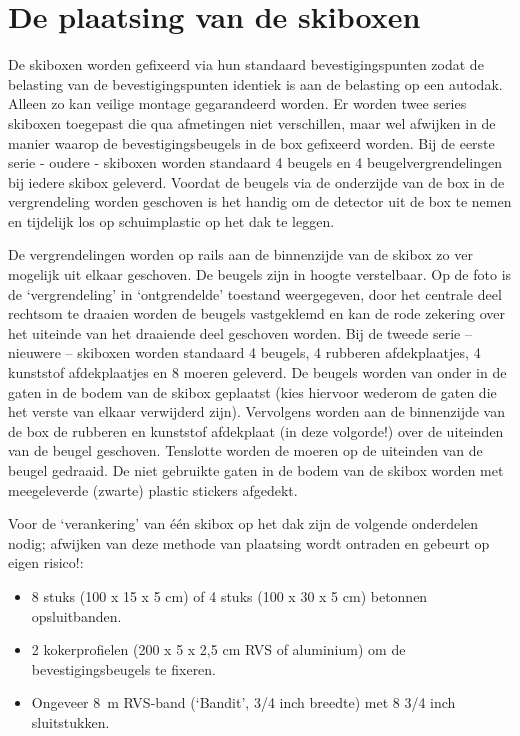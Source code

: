 \section{De plaatsing van de skiboxen}

De skiboxen worden gefixeerd via hun standaard bevestigingspunten zodat
de belasting van de bevestigingspunten identiek is aan de belasting op
een autodak. Alleen zo kan veilige montage gegarandeerd worden. Er
worden twee series skiboxen toegepast die qua afmetingen niet
verschillen, maar wel afwijken in de manier waarop de
bevestigingsbeugels in de box gefixeerd worden. Bij de eerste serie -
oudere - skiboxen worden standaard 4 beugels en 4 beugelvergrendelingen
bij iedere skibox geleverd. Voordat de beugels via de onderzijde van de
box in de vergrendeling worden geschoven is het handig om de detector
uit de box te nemen en tijdelijk los op schuimplastic op het dak te
leggen.

De vergrendelingen worden op rails aan de binnenzijde van de skibox zo
ver mogelijk uit elkaar geschoven. De beugels zijn in hoogte
verstelbaar. Op de foto is de ‘vergrendeling’ in ‘ontgrendelde’ toestand
weergegeven, door het centrale deel rechtsom te draaien worden de
beugels vastgeklemd en kan de rode zekering over het uiteinde van het
draaiende deel geschoven worden. Bij de tweede serie – nieuwere –
skiboxen worden standaard 4 beugels, 4 rubberen afdekplaatjes, 4
kunststof afdekplaatjes en 8 moeren geleverd. De beugels worden van
onder in de gaten in de bodem van de skibox geplaatst (kies hiervoor
wederom de gaten die het verste van elkaar verwijderd zijn). Vervolgens
worden aan de binnenzijde van de box de rubberen en kunststof afdekplaat
(in deze volgorde!) over de uiteinden van de beugel geschoven. Tenslotte
worden de moeren op de uiteinden van de beugel gedraaid. De niet
gebruikte gaten in de bodem van de skibox worden met meegeleverde
(zwarte) plastic stickers afgedekt.

Voor de ‘verankering’ van één skibox op het dak zijn de volgende
onderdelen nodig; afwijken van deze methode van plaatsing
wordt ontraden en gebeurt op eigen risico!:

\begin{itemize}
    \item 8 stuks (100 x 15 x 5 cm) of 4 stuks (100 x 30 x 5 cm)
    betonnen opsluitbanden.
    \item 2 kokerprofielen (200 x 5 x 2,5 cm RVS of aluminium) om de
    bevestigingsbeugels te fixeren.
    \item Ongeveer \SI{8}{\meter} RVS-band (‘Bandit’, 3/4 inch breedte)
    met 8 3/4 inch sluitstukken.
\end{itemize}

